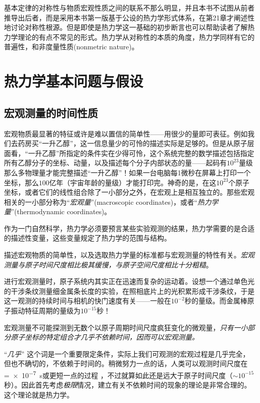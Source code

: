 基本定律的对称性与物质宏观性质之间的联系不那么明显，并且本书不试图从前者推导出后者，而是采用本书第一版基于公设的热力学形式体系，在第21章才阐述性地讨论对称性根源。但是即使是热力学这一基础的初步断言也可以帮助读者了解热力学理论的有点不常见的形式。热力学从对称性的本质的角度，热力学同样有它的普遍性，和非度量性质(nonmetric nature)。


\chapter{热力学基本问题与假设}
\label{chap1}
\section{宏观测量的时间性质}
\label{sec1.1}
宏观物质最显著的特征或许是难以置信的简单性——用很少的量即可表征。例如我们去药房买“一升乙醇”，这一信息量少的可怜的描述实际是足够的。但是从原子层面看，“一升乙醇”所指定的条件实在少得可怜，这个系统完整的数学描述包括指定所有乙醇分子的坐标、动量，以及描述每个分子内部状态的量——起码有$10^{23}$量级那么多物理量才能完整描述“一升乙醇”！如果一台电脑每1微秒在屏幕上打印一个坐标，那么$100$亿年（宇宙年龄的量级）才能打印完。神奇的是，在这$10^{23}$个原子坐标，或者它们的线性组合除了一小部分之外，在宏观上是相互独立的。那些宏观相关的一小部分称为“{\it 宏观量}”(macroscopic coordinates)，或者“{\it 热力学量}”(thermodynamic coordinates)。

作为一门自然科学，热力学必须要预言某些实验观测的结果，热力学需要的是合适的描述性变量，这些变量规定了热力学的范围与结构。

描述宏观物质的简单性，以及选取热力学量的标准都与宏观测量的特性有关。{\it 宏观测量与原子时间尺度相比极其缓慢，与原子空间尺度相比十分粗糙}。

进行宏观测量时，原子系统内其实正在迅速而复杂的运动着。设想一个通过单色光的干涉条纹测量细金属条长度的实验，在照相底片上的光积累形成干涉条纹，于是这一观测的持续时间与相机的快门速度有关——一般在$10^{-2}$秒的量级。而金属棒原子振动特征周期的量级为$10^{-15}$秒！

宏观测量不可能探测到无数个以原子周期时间尺度疯狂变化的微观量，{\it 只有一小部分原子坐标的特定组合才几乎不依赖时间，因而可以宏观测量。}

“{\it 几乎}”%
%
这个词是一个重要限定条件，实际上我们可观测的宏观过程是几乎完全，但也不确切的，不依赖于时间的。稍微努力一点的话，人类可以观测时间尺度在=\SI{e-7}{\second}或更短一点的过程%
%
，不过就算如此还是远大于原子时间尺度（$\sim 10^{-15}$秒）。因此首先考虑{\it 极限}情况，建立有关不依赖时间的现象的理论是非常合理的。这个理论就是热力学。

